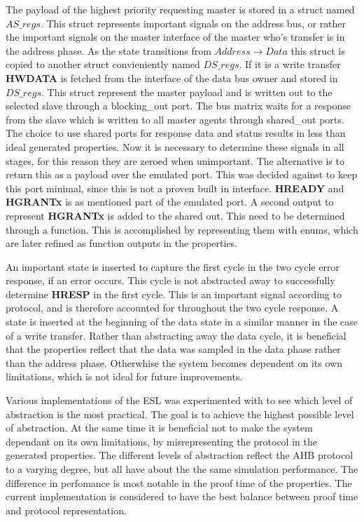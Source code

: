 The payload of the highest priority requesting master is stored in a struct named $AS\_regs$. This struct represents important signals on the address bus, or rather the important signals on the master interface of the master who's transfer is in the address phase. As the state transitions from $Address\rightarrow Data$ this struct is copied to another struct convieniently named $DS\_regs$. If it is a write transfer \textbf{HWDATA} is fetched from the interface of the data bus owner and stored in $DS\_regs$. This struct represent the master payload and is written out to the selected slave through a blocking\_out port. The bus matrix waits for a response from the slave which is written to all master agents through shared\_out ports. The choice to use shared ports for response data and status results in less than ideal generated properties. Now it is necessary to determine these signals in all stages, for this reason they are zeroed when unimportant. The alternative is to return this as a payload over the emulated port. This was decided against to keep this port minimal, since this is not a proven built in interface. \textbf{HREADY} and \textbf{HGRANTx} is as mentioned part of the emulated port. A second output to represent \textbf{HGRANTx} is added to the shared out. This need to be determined through a function. This is accomplished by representing them with enums, which are later refined as function outputs in the properties. \par 
An important state is inserted to capture the first cycle in the two cycle error response, if an error occurs. This cycle is not abstracted away to successfully determine \textbf{HRESP} in the first cycle. This is an important signal according to protocol, and is therefore accounted for throughout the two cycle response. A state is inserted at the beginning of the data state in a similar manner in the case of a write transfer. Rather than abstracting away the data cycle, it is beneficial that the properties reflect that the data was sampled in the data phase rather than the address phase. Otherwhise the system becomes dependent on its own limitations, which is not ideal for future improvements. \par
Various implementations of the ESL was experimented with to see which level of abstraction is the most practical. The goal is to achieve the highest possible level of abstraction. At the same time it is beneficial not to make the system dependant on its own limitations, by misrepresenting the protocol in the generated properties. The different levels of abstraction reflect the AHB protocol to a varying degree, but all have about the the same simulation performance. The difference in perfomance is most notable in the proof time of the properties. The current implementation is considered to have the best balance between proof time and protocol representation.       



